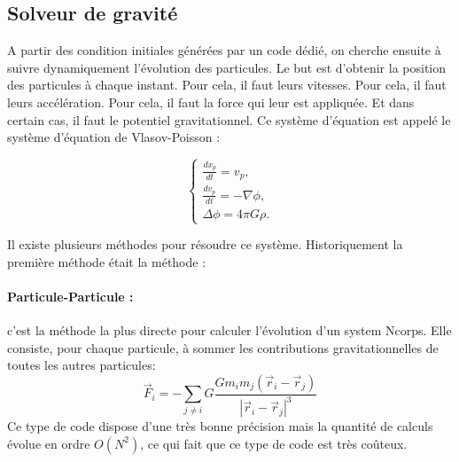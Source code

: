 %
%

\subsection{Solveur de gravité}
\label{sec:gravity}


A partir des condition initiales générées par un code dédié, on cherche ensuite à suivre dynamiquement l'évolution des particules.
Le but est d'obtenir la position des particules à chaque instant.
Pour cela, il faut leurs vitesses.
Pour cela, il faut leurs accélération.
Pour cela, il faut la force qui leur est appliquée.
Et dans certain cas, il faut le potentiel gravitationnel.
Ce système d'équation est appelé le système d'équation de Vlasov-Poisson :

\begin{equation}
\begin{cases}

\frac{d{x}_p}{dt} = { v}_p, \\
\frac{d{ v}_p}{dt} = -\nabla \phi , \\
\Delta \phi= 4\pi G \rho.

\end{cases}
\label{eq:Ncorps}
\end{equation}

Il existe plusieurs méthodes pour résoudre ce système.
Historiquement la première méthode était la méthode :
\paragraph{Particule-Particule : } c'est la méthode la plus directe pour calculer l'évolution d'un system Ncorps. 
Elle consiste, pour chaque particule, à sommer les contributions gravitationnelles de toutes les autres particules:
\begin{equation}
\vec{F}_i=-\sum_{j\neq i} G \frac{G m_i m_j(\vec{r}_i - \vec{r}_j) }{ |\vec{r}_i - \vec{r}_j |^3}
\end{equation}
Ce type de code dispose d'une très bonne précision mais la quantité de calculs évolue en ordre $O(N^2)$, ce qui fait que ce type de code est très coûteux.

